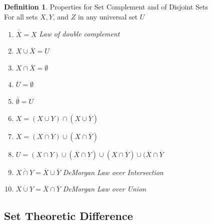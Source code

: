 \documentclass{book}
\theoremstyle{definition}
\newtheorem{definition}{Definition}[section]
\theoremstyle{remark}
\begin{document}
\newpage
\begin{definition}
Properties for Set Complement and of Disjoint Sets \\

For all sets $X, Y$, and $Z$ in any universal set $U$ \\

    \begin{enumerate}
        \item $\overline{\overline{X}} = X$ \textit{Law of double complement}
        \item $X \cup \overline{X} = U$
        \item $X \cap \overline{X} = \emptyset$
        \item $\overline{U} = \emptyset$
        \item $\overline{\emptyset} = U$ 
        \item $X = (X \cup Y) \cap (X \cup \overline{Y})$
        \item $X = (X \cap Y) \cup (X \cap \overline{Y})$
        \item $U = (X \cap Y) \cup (\overline{X} \cap Y) \cup (X \cap \overline{Y}) \cup (\overline{X} \cap \overline{Y}$
        \item $\overline{X \cap Y} = \overline{X} \cup \overline{Y}$ \textit{DeMorgan Law over Intersection}
        \item $\overline{X \cup Y} = \overline{X} \cap \overline{Y}$ \textit{DeMorgan Law over Union}
    \end{enumerate}
\end{definition}


\newpage
\subsection{Set Theoretic Difference}
\end{document}
